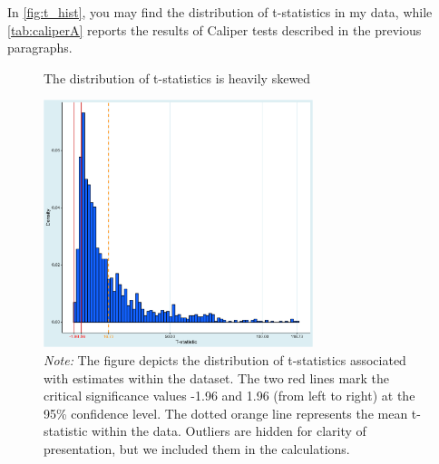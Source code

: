 In \autoref{fig:t_hist}, you may find the distribution of t-statistics in my data, while \autoref{tab:caliperA} reports the results of Caliper tests described in the previous paragraphs.



\begin{figure}[!b]
\centering
\caption{The distribution of t-statistics is heavily skewed}
\label{fig:t_hist}
\includegraphics[width=0.7\textwidth]{Figures/t_hist.png}
\captionsetup{width=0.7\textwidth, font = scriptsize}
\caption*{\emph{Note:} The figure depicts the distribution of t-statistics associated with estimates within the dataset. The two red lines mark the critical significance values -1.96 and 1.96 (from left to right) at the 95\% confidence level. The dotted orange line represents the mean t-statistic within the data. Outliers are hidden for clarity of presentation, but we included them in the calculations.}
\end{figure}


